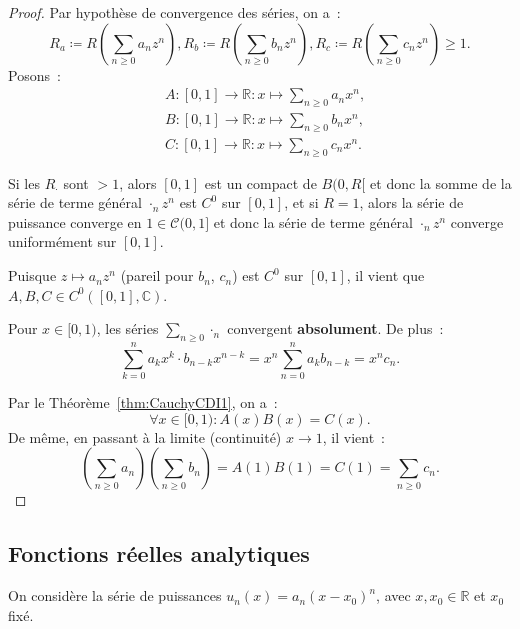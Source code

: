 \documentclass{report}
\theoremstyle{definition}
\theoremstyle{remark}
\numberwithin{equation}{section}
\newcommand{\C}{\mathbb C}
\newcommand{\R}{\mathbb R}
\begin{document}
			\begin{proof} Par hypothèse de convergence des séries, on a~:
			\begin{equation}
				R_a \coloneqq R\left(\sum_{n \geq 0}a_nz^n\right), R_b \coloneqq R\left(\sum_{n \geq 0}b_nz^n\right), R_c \coloneqq R\left(\sum_{n \geq 0}c_nz^n\right)
				\geq 1.
			\end{equation}
			Posons~:
			\begin{align}
				&A : [0, 1] \to \R : x \mapsto \sum_{n \geq 0}a_nx^n, \\
				&B : [0, 1] \to \R : x \mapsto \sum_{n \geq 0}b_nx^n, \\
				&C : [0, 1] \to \R : x \mapsto \sum_{n \geq 0}c_nx^n.
			\end{align}

			Si les $R_\cdot$ sont $> 1$, alors $[0, 1]$ est un compact de $B(0, R[$ et donc la somme de la série de terme général $\cdot_nz^n$ est $C^0$ sur
			$[0, 1]$, et si $R=1$, alors la série de puissance converge en $1 \in \mathcal C(0, 1]$ et donc la série de terme général $\cdot_nz^n$ converge
			uniformément sur $[0, 1]$.

			Puisque $z \mapsto a_nz^n$ (pareil pour $b_n$, $c_n$) est $C^0$ sur $[0, 1]$, il vient que $A, B, C \in C^0([0, 1], \C)$.

			Pour $x \in [0, 1)$, les séries $\sum_{n \geq 0}\cdot_n$ convergent \textbf{absolument}. De plus~:
			\begin{equation}
				\sum_{k=0}^na_kx^k\cdot b_{n-k}x^{n-k} = x^n\sum_{n=0}^na_kb_{n-k} = x^nc_n.
			\end{equation}

			Par le Théorème~\ref{thm:CauchyCDI1}, on a~:
			\begin{equation}
				\forall x \in [0, 1) : A(x)B(x) = C(x).
			\end{equation}
			De même, en passant à la limite (continuité) $x \to 1$, il vient~:
			\begin{equation}
				\left(\sum_{n \geq 0}a_n\right)\left(\sum_{n \geq 0}b_n\right) = A(1)B(1) = C(1) = \sum_{n\geq 0}c_n.
			\end{equation}
			\end{proof}

		\subsection{Fonctions réelles analytiques}
			On considère la série de puissances $u_n(x) = a_n(x - x_0)^n$, avec $x, x_0 \in \R$ et $x_0$ fixé.
\end{document}
